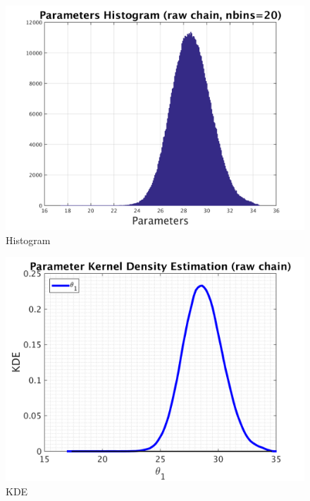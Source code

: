 \begin{figure}[H]
  
  \centering
   \includegraphics[scale=0.75]{53_results/output_700000/simple_ip_hist_raw}
   \caption{Histogram}
\end{figure}



\begin{figure}[H]
  
  \centering
   \includegraphics[scale=0.75]{53_results/output_700000/simple_ip_kde_raw}
   \caption{ KDE }
\end{figure}

